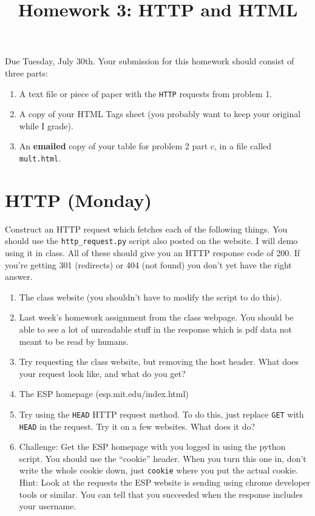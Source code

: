 \documentclass{article}
\title{Homework 3:  HTTP and HTML}
\begin{document}
\maketitle
Due Tuesday, July 30th.
Your submission for this homework should consist of three parts:
\begin{enumerate}
\item A text file or piece of paper with the \texttt{HTTP} requests from problem 1.
\item A copy of your HTML Tags sheet (you probably want to keep your original while I grade).
\item An {\bf emailed} copy of your table for problem 2 part c, in a file called \texttt{mult.html}.
\end{enumerate}

\section{HTTP (Monday)}
Construct an HTTP request which fetches each of the following things.  You should use the \texttt{http\_request.py} script also posted on the website.  I will demo using it in class.  All of these should give you an HTTP response code of 200.  If you're getting 301 (redirects) or 404 (not found) you don't yet have the right answer.
\begin{enumerate}[a]
\item The class website (you shouldn't have to modify the script to do this).
\item Last week's homework assignment from the class webpage.  You should be able to see a lot of unreadable stuff in the response which is pdf data not meant to be read by humans.
\item Try requesting the class website, but removing the host header.  What does your request look like, and what do you get?
\item The ESP homepage (esp.mit.edu/index.html)
\item Try using the \texttt{HEAD} HTTP request method.  To do this, just replace \texttt{GET} with \texttt{HEAD} in the request.  Try it on a few websites.  What does it do?
\item Challenge:  Get the ESP homepage with you logged in using the python script.  You should use the ``cookie'' header.  When you turn this one in, don't write the whole cookie down, just \texttt{cookie} where you put the actual cookie.  Hint:  Look at the requests the ESP website is sending using chrome developer tools or similar.  You can tell that you succeeded when the response includes your username.
\end{enumerate}
\end{document}
